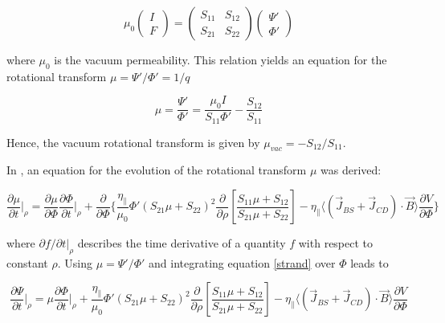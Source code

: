 \begin{equation} \label{IandF}
\mu_0
\left( \begin{array}{rr} I \\ F \end{array} \right)
=
\left( \begin{array}{rr} S_{11} & S_{12} \\ S_{21} & S_{22} \end{array} \right)
\left( \begin{array}{rr} \Psi' \\ \Phi' \end{array} \right)
\end{equation}

where $\mu_0$ is the vacuum permeability. This relation yields an equation for the rotational transform $\mu = \Psi'/\Phi' = 1/q$ \cite{strand2001}

\begin{equation} \label{boundcond}
\mu = \frac{\Psi'}{\Phi'} = \frac{\mu_0 I}{S_{11} \Phi'} - \frac{S_{12}}{S_{11}}
\end{equation}

Hence, the vacuum rotational transform is given by $\mu_{vac} = - S_{12}/S_{11}$. \newline

In \cite{strand2001}, an equation for the evolution of the rotational transform $\mu$ was derived:

\begin{equation}
\label{strand}
\frac{\partial \mu}{\partial t}\bigg|_\rho = \frac{\partial \mu}{\partial \Phi} \frac{\partial \Phi}{\partial t}\bigg|_\rho
+\frac{\partial}{\partial \Phi} \Bigg\{ \frac{\eta_{\parallel}}{\mu_0} \Phi' \left(S_{21} \mu + S_{22}\right)^2 \frac{\partial}{\partial \rho} \left[ \frac{S_{11} \mu + S_{12}}{S_{21} \mu + S_{22}} \right] - \eta_{\parallel} \big\langle ( \vec{J}_{BS} + \vec{J}_{CD} ) \cdot \vec{B} \big\rangle \frac{\partial V}{\partial \Phi}\Bigg\}
\end{equation}

where $\partial f/\partial t\big|_\rho$ describes the time derivative of a quantity $f$ with respect to constant $\rho$. Using $\mu = \Psi'/\Phi'$ and integrating equation \ref{strand} over $\Phi$ leads to

\begin{equation} \label{strandafterintegr}
\frac{\partial \Psi}{\partial t}\bigg|_\rho = \mu \frac{\partial \Phi}{\partial t}\bigg|_\rho
+\frac{\eta_{\parallel}}{\mu_0} \Phi' \left(S_{21} \mu + S_{22}\right)^2 \frac{\partial}{\partial \rho} \left[ \frac{S_{11} \mu + S_{12}}{S_{21} \mu + S_{22}} \right] - \eta_{\parallel} \big\langle ( \vec{J}_{BS} + \vec{J}_{CD} ) \cdot \vec{B} \big\rangle \frac{\partial V}{\partial \Phi}
\end{equation}


